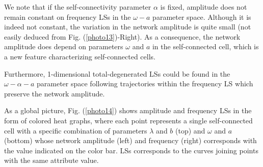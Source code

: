 We note that if the self-connectivity parameter $\alpha$ is fixed, amplitude does not remain constant on frequency LSs in the $\omega-a$ parameter space. Although it is indeed not constant, the variation in the network amplitude is quite small (not easily deduced from Fig. (\ref{photo13})-Right). As a consequence, the network amplitude does depend on parameters $\omega$ and $a$ in the self-connected cell, which is a new feature characterizing self-connected cells.

Furthermore, 1-dimensional total-degenerated LSs could be found in the $\omega-\alpha-a$ parameter space following trajectories within the frequency LS which preserve the network amplitude.

As a global picture, Fig. (\ref{photo14}) shows amplitude and frequency LSs in the form of colored heat graphs, where each point represents a single self-connected cell with a specific combination of parameters $\lambda$ and $b$ (top) and $\omega$ and $a$ (bottom) whose network amplitude (left) and frequency (right) corresponds with the value indicated on the color bar. LSs corresponds to the curves joining points with the same attribute value.

